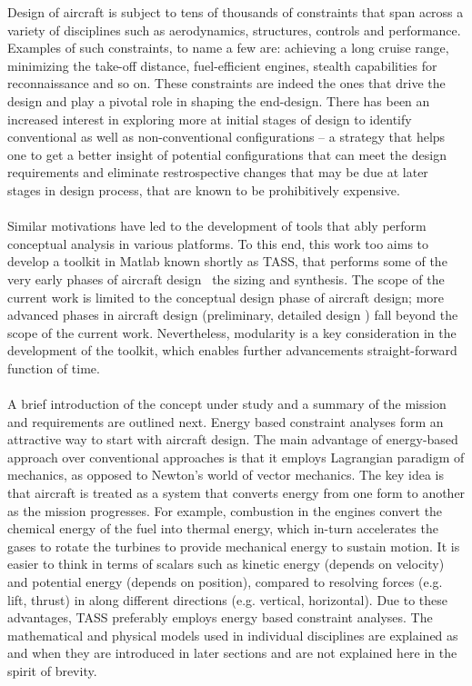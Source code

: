 \documentclass[pdftex,12pt,letter]{article}
\begin{document}
Design of aircraft is subject to tens of thousands of constraints that span across a variety of disciplines such as aerodynamics, structures, controls and performance\cite{NicolaiText,FieldingText,HoweText,RaymerText}. Examples of such constraints, to name a few are: achieving a long cruise range, minimizing the take-off distance, fuel-efficient engines, stealth capabilities for reconnaissance and so on. These constraints are indeed the ones that drive the design and play a pivotal role in shaping the end-design. There has been an increased interest in exploring more at initial stages of design to identify conventional as well as non-conventional configurations -- a strategy that helps one to get a better insight of potential configurations that can meet the design requirements and eliminate restrospective changes that may be due at later stages in design process, that are known to be prohibitively expensive. 
\\\\
Similar motivations have led to the development of tools that ably perform conceptual analysis in various platforms\cite{Raymer2004}. To this end, this work too aims to develop a toolkit in Matlab\cite{MATLAB} known shortly as TASS, that performs some of the very early phases of aircraft design \ie~the sizing and synthesis. The scope of the current work is limited to the conceptual design phase of aircraft design; more advanced phases in aircraft design (preliminary, detailed design \etc) fall beyond the scope of the current work. Nevertheless, modularity is a key consideration in the development of the toolkit, which enables further advancements straight-forward function of time.
\\\\
A brief introduction of the concept under study and a summary of the mission and requirements are  outlined next. Energy based constraint analyses form an attractive way to start with aircraft design. The main advantage of energy-based approach over conventional approaches is that it employs Lagrangian paradigm of mechanics, as opposed to Newton's world of vector mechanics. The key idea is that aircraft is treated as a system that converts energy from one form to another as the mission progresses. For example, combustion in the engines convert the chemical energy of the fuel into thermal energy, which in-turn accelerates the gases to rotate the turbines to provide mechanical energy to sustain motion. It is easier to think in terms of scalars such as kinetic energy (depends on velocity) and potential energy (depends on position), compared to resolving forces (e.g. lift, thrust) in along different directions (e.g. vertical, horizontal). Due to these advantages, \textsc{TASS} preferably employs energy based constraint analyses. The mathematical and physical models used in individual disciplines are explained as and when they are introduced in later sections and are not explained here in the spirit of brevity.
\end{document}
